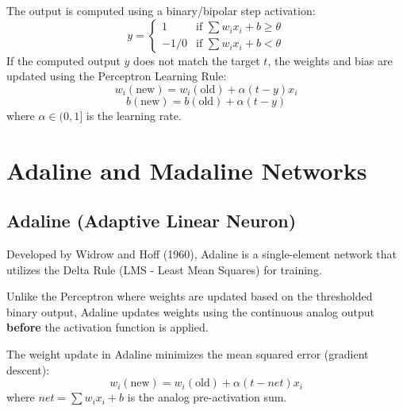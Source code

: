 \documentclass[12pt,a4paper]{article}
\begin{document}
\begin{tcolorbox}[formulabox, title={Perceptron Activation \& Weight Update}]
The output is computed using a binary/bipolar step activation:
\begin{equation}
  y = \begin{cases} 1 & \text{if } \sum w_i x_i + b \ge \theta \\ -1/0 & \text{if } \sum w_i x_i + b < \theta \end{cases}
\end{equation}
If the computed output $y$ does not match the target $t$, the weights and bias are updated using the Perceptron Learning Rule:
\begin{equation}
  w_i(\text{new}) = w_i(\text{old}) + \alpha (t - y) x_i
\end{equation}
\begin{equation}
  b(\text{new}) = b(\text{old}) + \alpha (t - y)
\end{equation}
where $\alpha \in (0, 1]$ is the learning rate.
\end{tcolorbox}

\section{Adaline and Madaline Networks}

\subsection{Adaline (Adaptive Linear Neuron)}
Developed by Widrow and Hoff (1960), Adaline is a single-element network that utilizes the Delta Rule (LMS - Least Mean Squares) for training.

\begin{tcolorbox}[defbox, title={Adaline vs. Perceptron}]
Unlike the Perceptron where weights are updated based on the thresholded binary output, Adaline updates weights using the continuous analog output \textbf{before} the activation function is applied.
\end{tcolorbox}

\par\noindent
The weight update in Adaline minimizes the mean squared error (gradient descent):
\begin{equation}
  w_i(\text{new}) = w_i(\text{old}) + \alpha (t - net) x_i
\end{equation}
where $net = \sum w_i x_i + b$ is the analog pre-activation sum.
\end{document}
